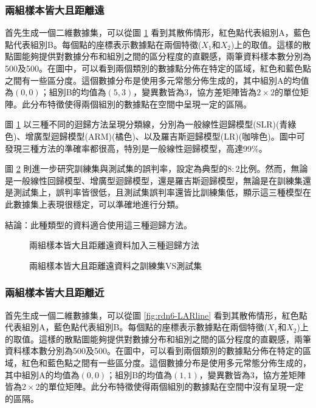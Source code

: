 \documentclass[12pt, a4paper]{article}
\begin{document}
\subsubsection{兩組樣本皆大且距離遠}
首先生成一個二維數據集，可以從圖 \ref{fig:rdn5-LARline} 看到其散佈情形，紅色點代表組別A，藍色點代表組別B。每個點的座標表示數據點在兩個特徵($X_1$和$X_2$)上的取值。這樣的散點圖能夠提供對數據分布和組別之間的區分程度的直觀感，兩筆資料樣本數分別為500及500。在圖中，可以看到兩個類別的數據點分佈在特定的區域，紅色和藍色點之間有一些區分度。這個數據分布是使用多元常態分佈生成的，其中組別A的均值為$(0, 0)$；組別B的均值為$(5, 3)$，變異數皆為3，協方差矩陣皆為$2 \times 2$的單位矩陣。此分布特徵使得兩個組別的數據點在空間中呈現一定的區隔。

圖 \ref{fig:rdn5-LARline} 以三種不同的迴歸方法呈現分類線，分別為一般線性迴歸模型(SLR)(青綠色)、增廣型迴歸模型(ARM)(橘色)、以及羅吉斯迴歸模型(LR)(咖啡色)。圖中可發現三種方法的準確率都很高，特別是一般線性迴歸模型，高達99\%。

圖 \ref{fig:rdn5-LARline2} 則進一步研究訓練集與測試集的誤判率，設定為典型的$8:2$比例。然而，無論是一般線性回歸模型、增廣型迴歸模型，還是羅吉斯迴歸模型，無論是在訓練集還是測試集上，誤判率皆很低，且測試集誤判率還皆比訓練集低，顯示這三種模型在此數據集上表現很穩定，可以準確地進行分類。

結論：此種類型的資料適合使用這三種迴歸方法。
\begin{figure}[H]
    \caption{兩組樣本皆大且距離遠資料加入三種迴歸方法}
    \label{fig:rdn5-LARline}
\end{figure}
\begin{figure}[H]
    \caption{兩組樣本皆大且距離遠資料之訓練集VS測試集}
    \label{fig:rdn5-LARline2}
\end{figure}
\subsubsection{兩組樣本皆大且距離近}

首先生成一個二維數據集，可以從圖 \ref{fig:rdn6-LARline} 看到其散佈情形，紅色點代表組別A，藍色點代表組別B。每個點的座標表示數據點在兩個特徵($X_1$和$X_2$)上的取值。這樣的散點圖能夠提供對數據分布和組別之間的區分程度的直觀感，兩筆資料樣本數分別為500及500。在圖中，可以看到兩個類別的數據點分佈在特定的區域，紅色和藍色點之間有一些區分度。這個數據分布是使用多元常態分佈生成的，其中組別A的均值為$(0, 0)$；組別B的均值為$(1, 1)$，變異數皆為3，協方差矩陣皆為$2 \times 2$的單位矩陣。此分布特徵使得兩個組別的數據點在空間中沒有呈現一定的區隔。
\end{document}

